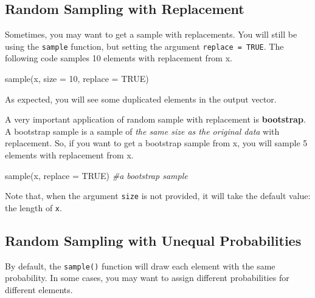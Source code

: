 \documentclass[
]{book}
\newenvironment{Shaded}{\begin{snugshade}}{\end{snugshade}}
\newcommand{\AttributeTok}[1]{\textcolor[rgb]{0.77,0.63,0.00}{#1}}
\newcommand{\CommentTok}[1]{\textcolor[rgb]{0.56,0.35,0.01}{\textit{#1}}}
\newcommand{\ConstantTok}[1]{\textcolor[rgb]{0.00,0.00,0.00}{#1}}
\newcommand{\DecValTok}[1]{\textcolor[rgb]{0.00,0.00,0.81}{#1}}
\newcommand{\FunctionTok}[1]{\textcolor[rgb]{0.00,0.00,0.00}{#1}}
\newcommand{\NormalTok}[1]{#1}
\newenvironment{infobox}[1]
  {
  \begin{itemize}
  \renewcommand{\labelitemi}{
    \raisebox{-.7\height}[0pt][0pt]{
      {\setkeys{Gin}{width=3em,keepaspectratio}
        \texttt{[image: pics/\#1]}}
    }
  }
  \setlength{\fboxsep}{1em}
  \begin{blackbox}
  \item
  }
  {
  \end{blackbox}
  \end{itemize}
  }
\newenvironment{blackbox}{
  \definecolor{shadecolor}{rgb}{0, 0, 0}  %
  \color{white}
  \begin{shaded}}
 {\end{shaded}}
\begin{document}
\hypertarget{random-sampling-with-replacement}{%
\subsection{Random Sampling with Replacement}\label{random-sampling-with-replacement}}

Sometimes, you may want to get a sample with replacements. You will still be using the \texttt{sample} function, but setting the argument \texttt{replace\ =\ TRUE}. The following code samples 10 elements with replacement from x.

\begin{Shaded}
\begin{Highlighting}[]
\FunctionTok{sample}\NormalTok{(x, }\AttributeTok{size =} \DecValTok{10}\NormalTok{, }\AttributeTok{replace =} \ConstantTok{TRUE}\NormalTok{)}
\end{Highlighting}
\end{Shaded}

As expected, you will see some duplicated elements in the output vector.

A very important application of random sample with replacement is \textbf{bootstrap}. A bootstrap sample is a sample of \emph{the same size as the original data} with replacement. So, if you want to get a bootstrap sample from x, you will sample 5 elements with replacement from x.

\begin{Shaded}
\begin{Highlighting}[]
\FunctionTok{sample}\NormalTok{(x, }\AttributeTok{replace =} \ConstantTok{TRUE}\NormalTok{) }\CommentTok{\#a bootstrap sample}
\end{Highlighting}
\end{Shaded}

\begin{infobox}{caution}
Note that, when the argument \texttt{size} is not provided, it will take the default value: the length of \texttt{x}.

\end{infobox}

\hypertarget{random-sampling-with-unequal-probabilities}{%
\subsection{Random Sampling with Unequal Probabilities}\label{random-sampling-with-unequal-probabilities}}

By default, the \texttt{sample()} function will draw each element with the same probability. In some cases, you may want to assign different probabilities for different elements.
\end{document}

